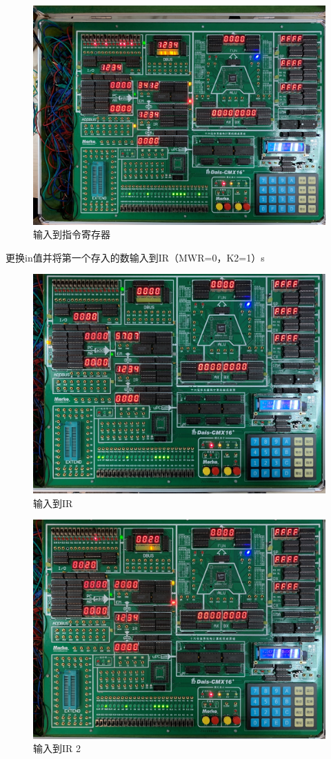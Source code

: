 \documentclass[a4paper,10pt,UTF8]{paper}
\numberwithin{equation}{section}
\numberwithin{figure}{section}
\begin{document}
\begin{figure}[h]
  \centering
  \includegraphics[width=0.9\linewidth]{2.jpg}
  \caption{输入到指令寄存器}
  \label{fig:2}
\end{figure}

更换in值并将第一个存入的数输入到IR（MWR=0，K2=1）s

\begin{figure}[h]
  \centering
  \includegraphics[width=0.9\linewidth]{3.jpg}
  \caption{输入到IR}
  \label{fig:3}
\end{figure}

\begin{figure}[h]
  \centering
  \includegraphics[width=0.9\linewidth]{4.jpg}
  \caption{输入到IR 2}
  \label{fig:4}
\end{figure}
\end{document}

